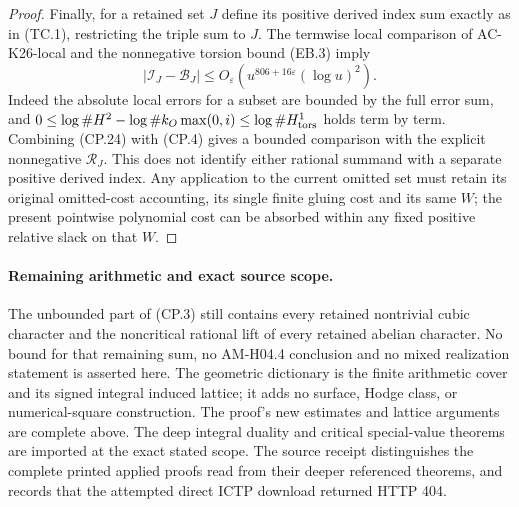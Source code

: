 \begin{proof}
Finally, for a retained set $J$ define its positive derived
index sum exactly as in (TC.1), restricting the triple sum to
$J$.  The termwise local comparison of AC-K26-local and the
nonnegative torsion bound (EB.3) imply
\[
       |\mathcal I_J-\mathcal B_J|
          \leq O_\varepsilon
                  (u^{806+16\varepsilon}(\log u)^2).             \tag{CP.24}
\]
Indeed the absolute local errors for a subset are bounded by
the full error sum, and
$0\leq\log\#H^2-\log\#k_O\max(0,i)\leq
\log\#H^1_{\rm tors}$ holds term by term.
Combining (CP.24) with (CP.4) gives a bounded comparison with
the explicit nonnegative $\mathcal R_J$.  This does not
identify either rational summand with a separate positive
derived index.  Any application to the current omitted set
must retain its original omitted-cost accounting, its single
finite gluing cost and its same $W$; the present pointwise
polynomial cost can be absorbed within any fixed positive
relative slack on that $W$.
\end{proof}

\paragraph{Remaining arithmetic and exact source scope.}
The unbounded part of (CP.3) still contains every retained
nontrivial cubic character and the noncritical rational lift
of every retained abelian character.  No bound for that
remaining sum, no AM-H04.4 conclusion and no mixed realization
statement is asserted here.  The geometric dictionary is the
finite arithmetic cover and its signed integral induced
lattice; it adds no surface, Hodge class, or numerical-square
construction.  The proof's new estimates and lattice arguments
are complete above.  The deep integral duality and critical
special-value theorems are imported at the exact stated scope.
The source receipt distinguishes the complete printed applied
proofs read from their deeper referenced theorems, and records
that the attempted direct ICTP download returned HTTP 404.
